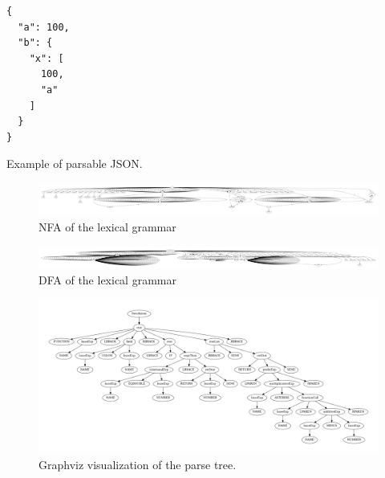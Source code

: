 \begin{listing}[H]
\begin{verbatim}
{
  "a": 100,
  "b": {
    "x": [
      100,
      "a"
    ]
  }
}
\end{verbatim}
\caption{Example of parsable JSON.}
\hrulefill
\label{lst:json_example}
\end{listing}

\begin{figure}[t]
\includegraphics[width=\linewidth]{images/nfa.png}
\caption{NFA of the lexical grammar}
\label{fig:nfa}
\end{figure}

\begin{figure}[t]
\includegraphics[width=\linewidth]{images/dfa.png}
\caption{DFA of the lexical grammar}
\label{fig:dfa}
\end{figure}

\begin{figure}[t]
\includegraphics[width=\linewidth]{images/ptree.png}
\caption{Graphviz visualization of the parse tree.}
\label{fig:parse_tree}
\end{figure}

